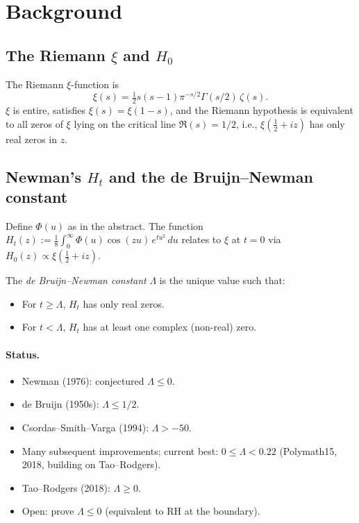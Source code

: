 \documentclass[11pt,a4paper]{article}
\begin{document}
\tableofcontents

\section{Background}\label{sec:background}

\subsection{The Riemann $\xi$ and $H_0$}
The Riemann $\xi$-function is
\[
\xi(s) = \tfrac{1}{2} s(s-1) \pi^{-s/2} \Gamma(s/2)\, \zeta(s).
\]
$\xi$ is entire, satisfies $\xi(s) = \xi(1-s)$, and the Riemann hypothesis is
equivalent to all zeros of $\xi$ lying on the critical line $\Re(s) = 1/2$, i.e.,
$\xi(\tfrac{1}{2} + iz)$ has only real zeros in $z$.

\subsection{Newman's $H_t$ and the de Bruijn--Newman constant}
Define $\Phi(u)$ as in the abstract. The function $H_t(z) := \frac{1}{8}
\int_0^\infty \Phi(u) \cos(zu)\, e^{tu^2}\, du$ relates to $\xi$ at $t = 0$ via
$H_0(z) \propto \xi(\tfrac{1}{2} + iz)$.

The \emph{de Bruijn--Newman constant} $\Lambda$ is the unique value such that:
\begin{itemize}
\item For $t \ge \Lambda$, $H_t$ has only real zeros.
\item For $t < \Lambda$, $H_t$ has at least one complex (non-real) zero.
\end{itemize}

\paragraph{Status.}
\begin{itemize}
\item Newman (1976): conjectured $\Lambda \le 0$.
\item de Bruijn (1950s): $\Lambda \le 1/2$.
\item Csordas--Smith--Varga (1994): $\Lambda > -50$.
\item Many subsequent improvements; current best: $0 \le \Lambda < 0.22$
(Polymath15, 2018, building on Tao--Rodgers).
\item Tao--Rodgers (2018): $\Lambda \ge 0$.
\item Open: prove $\Lambda \le 0$ (equivalent to RH at the boundary).
\end{itemize}
\end{document}

